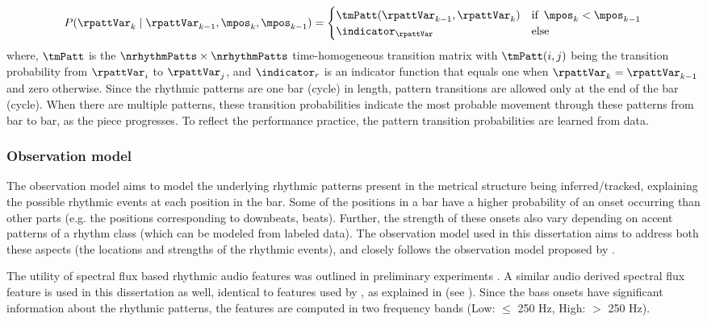 \begin{equation}\label{eqn:bpm:transpatt}
P(\rpattVar_{k} \mid \rpattVar_{k-1},\mpos_{k},\mpos_{k-1}) = 
\begin{cases}
 \tmPatt(\rpattVar_{k-1},\rpattVar_{k}) & \text{if} \,\,\, \mpos_{k} < \mpos_{k-1}\\
\indicator_{\rpattVar} & \text{else}
\end{cases}
\end{equation}
where, $\tmPatt$ is the $\nrhythmPatts \times \nrhythmPatts$ time-homogeneous transition matrix with $\tmPatt(i, j)$ being the transition probability from $\rpattVar_i$ to $\rpattVar_j$, and $\indicator_{r}$ is an indicator function that equals one when $\rpattVar_k = \rpattVar_{k-1}$ and zero otherwise. Since the rhythmic patterns are one bar (cycle) in length, pattern transitions are allowed only at the end of the bar (cycle). When there are multiple patterns, these transition probabilities indicate the most probable movement through these patterns from bar to bar, as the piece progresses. To reflect the performance practice, the pattern transition probabilities are learned from data.
\subsubsection{Observation model}
The observation model aims to model the underlying rhythmic patterns present in the metrical structure being inferred/tracked, explaining the possible rhythmic events at each position in the bar. Some of the positions in a bar have a higher probability of an onset occurring than other parts (e.g. the positions corresponding to downbeats, beats). Further, the strength of these onsets also vary depending on accent patterns of a rhythm class (which can be modeled from labeled data). The observation model used in this dissertation aims to address both these aspects (the locations and strengths of the rhythmic events), and closely follows the observation model proposed by . 

The utility of spectral flux based rhythmic audio features was outlined in preliminary experiments . A similar audio derived spectral flux feature is used in this dissertation as well, identical to features used by , as explained in  (see ). Since the bass onsets have significant information about the rhythmic patterns, the features are computed in two frequency bands (Low: $\leq$ 250 Hz, High: $>$ 250 Hz). 

